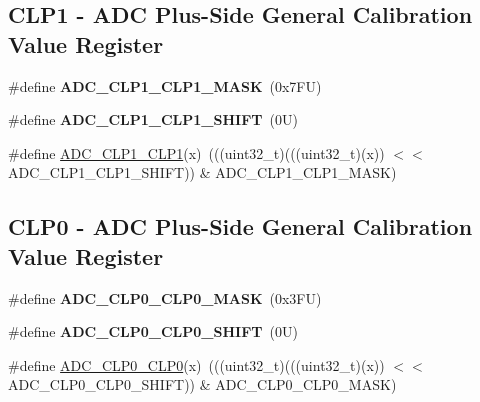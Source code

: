 \subsection*{C\+L\+P1 -\/ A\+DC Plus-\/\+Side General Calibration Value Register}
\begin{DoxyCompactItemize}
\item 
\mbox{\label{group___a_d_c___register___masks_ga597fddbb6d859ea54a49dd4a1eea72fb}} 
\#define {\bfseries A\+D\+C\+\_\+\+C\+L\+P1\+\_\+\+C\+L\+P1\+\_\+\+M\+A\+SK}~(0x7\+F\+U)
\item 
\mbox{\label{group___a_d_c___register___masks_gab34e145666bb569d17f381665d6f5156}} 
\#define {\bfseries A\+D\+C\+\_\+\+C\+L\+P1\+\_\+\+C\+L\+P1\+\_\+\+S\+H\+I\+FT}~(0\+U)
\item 
\#define \mbox{\hyperlink{group___a_d_c___register___masks_gaf48a7a2edeb5d0485c5cdfdf19bd3e18}{A\+D\+C\+\_\+\+C\+L\+P1\+\_\+\+C\+L\+P1}}(x)~(((uint32\+\_\+t)(((uint32\+\_\+t)(x)) $<$$<$ A\+D\+C\+\_\+\+C\+L\+P1\+\_\+\+C\+L\+P1\+\_\+\+S\+H\+I\+FT)) \& A\+D\+C\+\_\+\+C\+L\+P1\+\_\+\+C\+L\+P1\+\_\+\+M\+A\+SK)
\end{DoxyCompactItemize}
\subsection*{C\+L\+P0 -\/ A\+DC Plus-\/\+Side General Calibration Value Register}
\begin{DoxyCompactItemize}
\item 
\mbox{\label{group___a_d_c___register___masks_ga7a8099e7e4fcb450308767ab0df8e458}} 
\#define {\bfseries A\+D\+C\+\_\+\+C\+L\+P0\+\_\+\+C\+L\+P0\+\_\+\+M\+A\+SK}~(0x3\+F\+U)
\item 
\mbox{\label{group___a_d_c___register___masks_gad3035c445e10948c653ac0a028008109}} 
\#define {\bfseries A\+D\+C\+\_\+\+C\+L\+P0\+\_\+\+C\+L\+P0\+\_\+\+S\+H\+I\+FT}~(0\+U)
\item 
\#define \mbox{\hyperlink{group___a_d_c___register___masks_ga8ec1b8f6f0baa869f77385865e51a20d}{A\+D\+C\+\_\+\+C\+L\+P0\+\_\+\+C\+L\+P0}}(x)~(((uint32\+\_\+t)(((uint32\+\_\+t)(x)) $<$$<$ A\+D\+C\+\_\+\+C\+L\+P0\+\_\+\+C\+L\+P0\+\_\+\+S\+H\+I\+FT)) \& A\+D\+C\+\_\+\+C\+L\+P0\+\_\+\+C\+L\+P0\+\_\+\+M\+A\+SK)
\end{DoxyCompactItemize}
